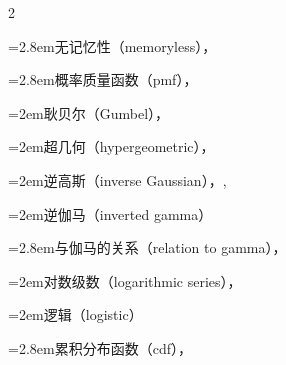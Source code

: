 \begin{multicols}{2}
\par\noindent\hangindent=2.8em\hspace*{1.8em}\label{idx:320}无记忆性（memoryless），\hyperref[eq:3.2.11]{\pageref*{eq:3.2.11}}\par
\par\noindent\hangindent=2.8em\hspace*{1.8em}\label{idx:321}概率质量函数（pmf），\hyperref[ex:1.6.2]{\pageref*{ex:1.6.2}}\par
\par\noindent\hangindent=2em\hspace*{1em}\label{idx:322}耿贝尔（Gumbel），\hyperref[idxocc:322:139]{\pageref*{idxocc:322:139}}\par
\par\noindent\hangindent=2em\hspace*{1em}\label{idx:323}超几何（hypergeometric），\hyperref[eq:3.2.2]{\pageref*{eq:3.2.2}}\par
\par\noindent\hangindent=2em\hspace*{1em}\label{idx:324}逆高斯（inverse Gaussian），\hyperref[exercise:6.27]{\pageref*{exercise:6.27}}, \hyperref[exercise:7.15]{\pageref*{exercise:7.15}}\par
{}
\par\noindent\hangindent=2em\hspace*{1em}\label{idx:325}逆伽马（inverted gamma）\par
\par\noindent\hangindent=2.8em\hspace*{1.8em}\label{idx:326}与伽马的关系（relation to gamma），\hyperref[ex:2.1.6]{\pageref*{ex:2.1.6}}\par
\par\noindent\hangindent=2em\hspace*{1em}\label{idx:327}对数级数（logarithmic series），\hyperref[exercise:3.14]{\pageref*{exercise:3.14}}\par
{}
\par\noindent\hangindent=2em\hspace*{1em}\label{idx:328}逻辑（logistic）\par
\par\noindent\hangindent=2.8em\hspace*{1.8em}\label{idx:329}累积分布函数（cdf），\hyperref[ex:1.5.5]{\pageref*{ex:1.5.5}}\par

\end{multicols}
